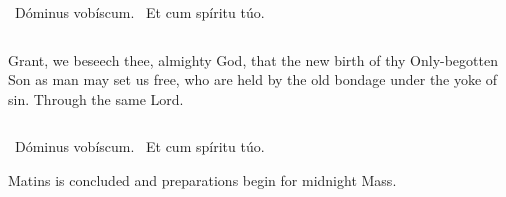 {{  }

  {
    \bigskip
    \medskip
  }

  \Vbar{}~Dóminus vobíscum. \Rbar{}~Et cum spíritu túo.
  \bigskip

  {


  }
  \smallskip

  {
    \begin{columns}
           {Grant, we beseech thee, almighty God, that the new birth of thy Only-begotten Son as man may set us free, who are held by the old bondage under the yoke of sin. Through the same Lord.}
    \end{columns}
  }
  \bigskip{}

  \Vbar{}~Dóminus vobíscum. \Rbar{}~Et cum spíritu túo.

  \bigskip{}
  {
    \def\annot{\small{5.}}
    \large
    \def\breakbeforeresp{T}
    \greblockcustos

    \bigskip{}

    \noindent{}Matins is concluded and preparations begin for midnight Mass.
  }
}